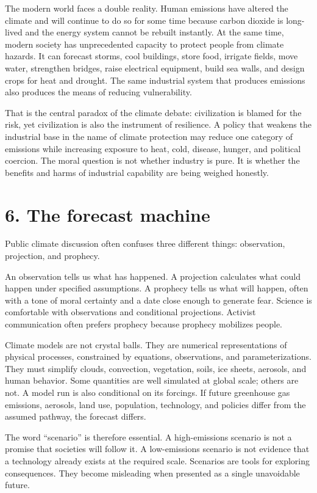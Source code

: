 ﻿\documentclass[12pt,a4paper]{book}
\begin{document}
The modern world faces a double reality. Human emissions have altered the climate and will continue to do so for some time because carbon dioxide is long-lived and the energy system cannot be rebuilt instantly. At the same time, modern society has unprecedented capacity to protect people from climate hazards. It can forecast storms, cool buildings, store food, irrigate fields, move water, strengthen bridges, raise electrical equipment, build sea walls, and design crops for heat and drought. The same industrial system that produces emissions also produces the means of reducing vulnerability.

That is the central paradox of the climate debate: civilization is blamed for the risk, yet civilization is also the instrument of resilience. A policy that weakens the industrial base in the name of climate protection may reduce one category of emissions while increasing exposure to heat, cold, disease, hunger, and political coercion. The moral question is not whether industry is pure. It is whether the benefits and harms of industrial capability are being weighed honestly.

\section{6. The forecast machine}
Public climate discussion often confuses three different things: observation, projection, and prophecy.

An observation tells us what has happened. A projection calculates what could happen under specified assumptions. A prophecy tells us what will happen, often with a tone of moral certainty and a date close enough to generate fear. Science is comfortable with observations and conditional projections. Activist communication often prefers prophecy because prophecy mobilizes people.

Climate models are not crystal balls. They are numerical representations of physical processes, constrained by equations, observations, and parameterizations. They must simplify clouds, convection, vegetation, soils, ice sheets, aerosols, and human behavior. Some quantities are well simulated at global scale; others are not. A model run is also conditional on its forcings. If future greenhouse gas emissions, aerosols, land use, population, technology, and policies differ from the assumed pathway, the forecast differs.

The word ``scenario'' is therefore essential. A high-emissions scenario is not a promise that societies will follow it. A low-emissions scenario is not evidence that a technology already exists at the required scale. Scenarios are tools for exploring consequences. They become misleading when presented as a single unavoidable future.
\end{document}
